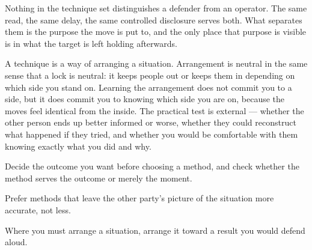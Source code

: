 


\begin{core}
Nothing in the technique set distinguishes a defender from an operator. The same read, the same delay, the same controlled disclosure serves both. What separates them is the purpose the move is put to, and the only place that purpose is visible is in what the target is left holding afterwards.
\end{core}

\begin{mechanism}
A technique is a way of arranging a situation. Arrangement is neutral in the same sense that a lock is neutral: it keeps people out or keeps them in depending on which side you stand on. Learning the arrangement does not commit you to a side, but it does commit you to knowing which side you are on, because the moves feel identical from the inside. The practical test is external --- whether the other person ends up better informed or worse, whether they could reconstruct what happened if they tried, and whether you would be comfortable with them knowing exactly what you did and why.
\end{mechanism}

\begin{application}
  \item Decide the outcome you want before choosing a method, and check whether the method serves the outcome or merely the moment.
  \item Prefer methods that leave the other party's picture of the situation more accurate, not less.
  \item Where you must arrange a situation, arrange it toward a result you would defend aloud.
\end{application}

